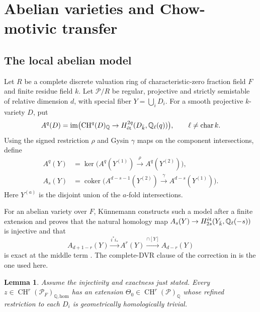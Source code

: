 \documentclass[11pt,a4paper]{article}
\newtheorem{lemma}[theorem]{Lemma}
\theoremstyle{definition}
\theoremstyle{remark}\newtheorem{remark}[theorem]{Remark}
\numberwithin{equation}{section}
\newcommand{\Q}{\mathbb Q}\newcommand{\R}{\mathbb R}\newcommand{\C}{\mathbb C}
\newcommand{\CH}{\operatorname{CH}}\newcommand{\an}{\mathrm{an}}
\newcommand{\homol}{\mathrm{hom}}\newcommand{\BC}{\mathrm{BC}}
\begin{document}
\section{Abelian varieties and Chow-motivic transfer}\label{sec:transfer}

\subsection{The local abelian model}

Let $R$ be a complete discrete valuation ring of characteristic-zero
fraction field $F$ and finite residue field $k$. Let $\mathcal P/R$ be
regular, projective and strictly semistable of relative dimension $d$,
with special fiber $Y=\bigcup_iD_i$. For a smooth projective
$k$-variety $D$, put
\[
 A^q(D)=\operatorname{im}\bigl(\CH^q(D)_\Q\to
 H^{2q}_{\textnormal{ét}}(D_{\bar k},\Q_\ell(q))\bigr),
 \qquad \ell\ne\operatorname{char}k.
\]
Using the signed restriction $\rho$ and Gysin $\gamma$ maps on the
component intersections, define
\begin{align*}
 A^q(Y)&=\ker\bigl(A^q(Y^{(1)})\xrightarrow{\rho}A^q(Y^{(2)})\bigr),\\
 A_s(Y)&=\operatorname{coker}\bigl(
 A^{d-s-1}(Y^{(2)})\xrightarrow{\gamma}A^{d-s}(Y^{(1)})\bigr).
\end{align*}
Here $Y^{(a)}$ is the disjoint union of the $a$-fold intersections.

For an abelian variety over $F$, K\"unnemann constructs such a model
after a finite extension and proves that the natural homology map
$A_s(Y)\to H^{\textnormal{ét}}_{2s}(Y_{\bar k},\Q_\ell(-s))$
is injective and that
\begin{equation}\label{eq:kun-complex}
 A_{d+1-r}(Y)\xrightarrow{i^*i_*}A^r(Y)
                  \xrightarrow{\cap[Y]}A_{d-r}(Y)
\end{equation}
is exact at the middle term \cite[Theorems 5.6 and 6.6]{Kun}.
The complete-DVR clause of the correction in \cite[\S5.8]{Kun}
is the one used here.

\begin{lemma}\label{lem:model-correction}
Assume the injectivity and exactness just stated. Every
$z\in\CH^r(\mathcal P_F)_{\Q,\homol}$ has an extension
$\Theta_0\in\CH^r(\mathcal P)_\Q$ whose refined restriction to
each $D_i$ is geometrically homologically trivial.
\end{lemma}
\end{document}
